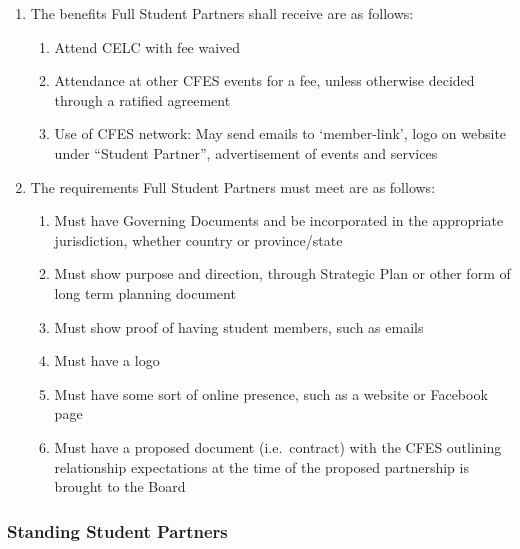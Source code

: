 \begin{enumerate}
 \item
  The benefits Full Student Partners shall receive are as follows:

  \begin{enumerate}
   \item
    Attend CELC with fee waived
   \item
    Attendance at other CFES events for a fee, unless otherwise decided through a ratified agreement
   \item
    Use of CFES network: May send emails to ‘member-link’, logo on website under “Student Partner”, advertisement of events and services
  \end{enumerate}

 \item
  The requirements Full Student Partners must meet are as follows:

  \begin{enumerate}
   \item
    Must have Governing Documents and be incorporated in the appropriate jurisdiction, whether country or province/state
   \item
    Must show purpose and direction, through Strategic Plan or other form of long term planning document
   \item
    Must show proof of having student members, such as emails
   \item
    Must have a logo
   \item
    Must have some sort of online presence, such as a website or Facebook page
   \item
    Must have a proposed document (i.e.~contract) with the CFES outlining relationship expectations at the time of the proposed partnership is brought to the Board
  \end{enumerate}
\end{enumerate}

\subsubsection{Standing Student Partners}
\label{standing-student-partners}

